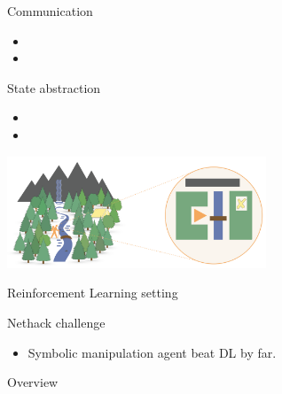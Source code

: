 \note[itemize]{
    \item 
}

\begin{frame}{Communication}
\begin{itemize}
    \item 
    \item 
\end{itemize}
\end{frame}

\begin{frame}{State abstraction}
    \begin{itemize}
        \item 
        \item 
    \end{itemize}
    \includegraphics[width=0.58\textwidth]{images/valueofabstraction.png}
\end{frame}

\begin{frame}{Reinforcement Learning setting}
    
\end{frame}

\begin{frame}{Nethack challenge}
\begin{itemize}
    \item Symbolic manipulation agent beat DL by far. 
\end{itemize}
\end{frame}

\begin{frame}{Overview}
    
\end{frame}

